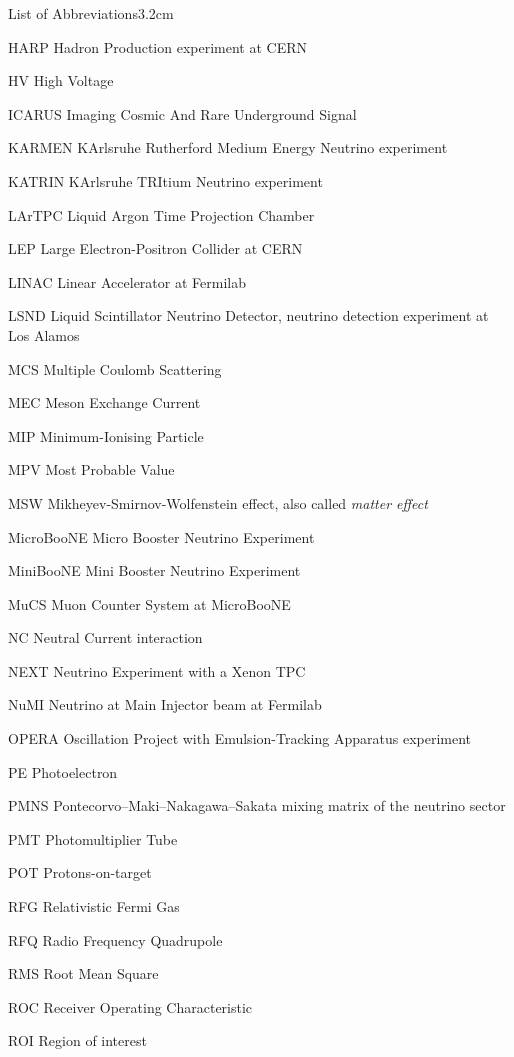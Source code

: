 \begin{mclistof}{List of Abbreviations}{3.2cm}
\item[HARP] Hadron Production experiment at CERN
\item[HV] High Voltage
\item[ICARUS] Imaging Cosmic And Rare Underground Signal
\item[KARMEN] KArlsruhe Rutherford Medium Energy Neutrino experiment
\item[KATRIN] KArlsruhe TRItium Neutrino experiment
\item[LArTPC] Liquid Argon Time Projection Chamber
\item[LEP] Large Electron-Positron Collider at CERN
\item[LINAC] Linear Accelerator at Fermilab
\item[LSND] Liquid Scintillator Neutrino Detector, neutrino detection experiment at Los Alamos
\item[MCS] Multiple Coulomb Scattering
\item[MEC] Meson Exchange Current
\item[MIP] Minimum-Ionising Particle
\item[MPV] Most Probable Value
\item[MSW] Mikheyev-Smirnov-Wolfenstein effect, also called \emph{matter effect}
\item[MicroBooNE] Micro Booster Neutrino Experiment
\item[MiniBooNE] Mini Booster Neutrino Experiment
\item[MuCS] Muon Counter System at MicroBooNE
\item[NC] Neutral Current interaction
\item[NEXT] Neutrino Experiment with a Xenon TPC
\item[NuMI] Neutrino at Main Injector beam at Fermilab
\item[OPERA] Oscillation Project with Emulsion-Tracking Apparatus experiment
\item[PE] Photoelectron
\item[PMNS] Pontecorvo–Maki–Nakagawa–Sakata mixing matrix of the neutrino sector
\item[PMT] Photomultiplier Tube
\item[POT] Protons-on-target
\item[RFG] Relativistic Fermi Gas
\item[RFQ] Radio Frequency Quadrupole
\item[RMS] Root Mean Square
\item[ROC] Receiver Operating Characteristic
\item[ROI] Region of interest

\end{mclistof}

